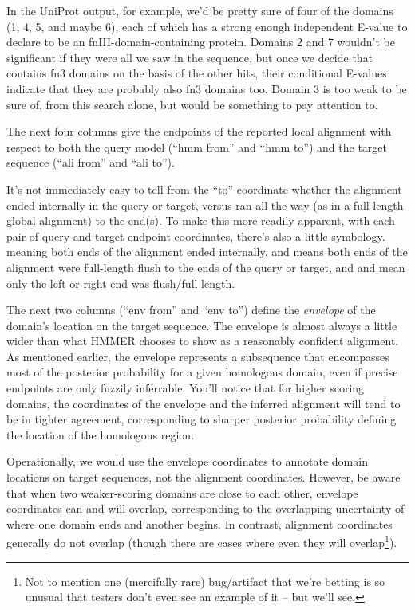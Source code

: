 In the UniProt output, for example, we'd be pretty sure of four of the
domains (1, 4, 5, and maybe 6), each of which has a strong enough
independent E-value to declare  to be an
fnIII-domain-containing protein. Domains 2 and 7 wouldn't be
significant if they were all we saw in the sequence, but once we decide
that  contains fn3 domains on the basis of the
other hits, their conditional E-values indicate that they are probably
also fn3 domains too. Domain 3 is too weak to be sure of, from this
search alone, but would be something to pay attention to.

The next four columns give the endpoints of the reported local
alignment with respect to both the query model (``hmm from'' and ``hmm
to'') and the target sequence (``ali from'' and ``ali to''). 

It's not immediately easy to tell from the ``to'' coordinate whether
the alignment ended internally in the query or target, versus ran all
the way (as in a full-length global alignment) to the end(s). To make
this more readily apparent, with each pair of query and target
endpoint coordinates, there's also a little symbology. 
meaning both ends of the alignment ended internally, and \prog{[]}
means both ends of the alignment were full-length flush to the ends of
the query or target, and \prog{[.} and \prog{.]} mean only the left or
right end was flush/full length. 

The next two columns (``env from'' and ``env to'') define the
\emph{envelope} of the domain's location on the target sequence.  The
envelope is almost always a little wider than what HMMER chooses to
show as a reasonably confident alignment. As mentioned earlier, the
envelope represents a subsequence that encompasses most of the
posterior probability for a given homologous domain, even if precise
endpoints are only fuzzily inferrable. You'll notice that for higher
scoring domains, the coordinates of the envelope and the inferred
alignment will tend to be in tighter agreement, corresponding to
sharper posterior probability defining the location of the homologous
region. 

Operationally, we would use the envelope coordinates to annotate domain
locations on target sequences, not the alignment coordinates. However,
be aware that when two weaker-scoring domains are close to each other,
envelope coordinates can and will overlap, corresponding to the
overlapping uncertainty of where one domain ends and another begins.
In contrast, alignment coordinates generally do not overlap (though
there are cases where even they will overlap\footnote{Not to mention
  one (mercifully rare) bug/artifact that we're betting is so unusual
  that testers don't even see an example of it -- but we'll
  see.}).


